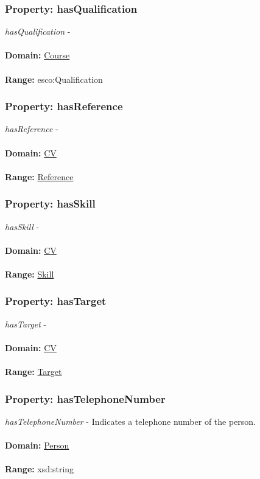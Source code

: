 \documentclass[a4paper,12pt]{article}
\numberwithin{equation}{section}
\begin{document}
\subsubsection{Property: hasQualification}\hypertarget{hasQualification}{}
\textit{hasQualification} -
\\\\
\textbf{Domain:} \hyperlink{Course}{Course} 
\\\\
\textbf{Range:}  esco:Qualification

\subsubsection{Property: hasReference}\hypertarget{hasReference}{}
\textit{hasReference} - 
\\\\
\textbf{Domain:} \hyperlink{CV}{CV} 
\\\\
\textbf{Range:}  \hyperlink{Reference}{Reference} 

\subsubsection{Property: hasSkill}\hypertarget{hasSkill}{}
\textit{hasSkill} - 
\\\\
\textbf{Domain:} \hyperlink{CV}{CV} 
\\\\
\textbf{Range:}  \hyperlink{Skill}{Skill} 

\subsubsection{Property: hasTarget}\hypertarget{hasTarget}{}
\textit{hasTarget} - 
\\\\
\textbf{Domain:} \hyperlink{CV}{CV} 
\\\\
\textbf{Range:}  \hyperlink{Target}{Target}


\subsubsection{Property: hasTelephoneNumber}\hypertarget{hasTelephoneNumber}{}
\textit{hasTelephoneNumber} - Indicates a telephone number of the person.
\\\\
\textbf{Domain:} \hyperlink{Person}{Person} 
\\\\
\textbf{Range:}  xsd:string
\end{document}
